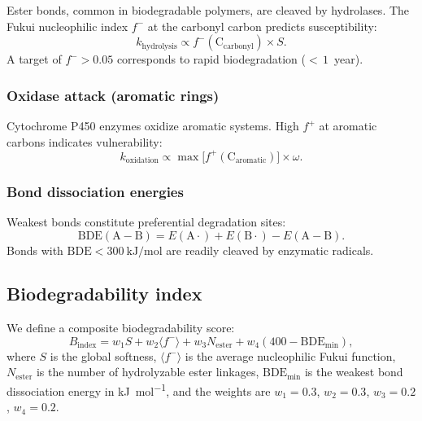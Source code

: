 \documentclass[11pt,a4paper]{article}
\begin{document}
Ester bonds, common in biodegradable polymers, are cleaved by hydrolases. The Fukui nucleophilic index $f^-$ at the carbonyl carbon predicts susceptibility:
\begin{equation}
k_{\mathrm{hydrolysis}} \propto f^-(\mathrm{C}_{\mathrm{carbonyl}}) \times S.
\end{equation}
A target of $f^- > 0.05$ corresponds to rapid biodegradation (${<}\,1$~year).

\subsubsection{Oxidase attack (aromatic rings)}

Cytochrome P450 enzymes oxidize aromatic systems. High $f^+$ at aromatic carbons indicates vulnerability:
\begin{equation}
k_{\mathrm{oxidation}} \propto \max\!\bigl[f^+(\mathrm{C}_{\mathrm{aromatic}})\bigr] \times \omega.
\end{equation}

\subsubsection{Bond dissociation energies}

Weakest bonds constitute preferential degradation sites:
\begin{equation}
\mathrm{BDE}(\mathrm{A{-}B}) = E(\mathrm{A}{\cdot}) + E(\mathrm{B}{\cdot}) - E(\mathrm{A{-}B}).
\end{equation}
Bonds with $\mathrm{BDE} < \SI{300}{\kilo\joule\per\mole}$ are readily cleaved by enzymatic radicals.

\subsection{Biodegradability index}

We define a composite biodegradability score:
\begin{equation}
B_{\mathrm{index}} = w_1 S + w_2 \langle f^- \rangle + w_3 N_{\mathrm{ester}} + w_4 (400 - \mathrm{BDE}_{\mathrm{min}}),
\end{equation}
where $S$ is the global softness, $\langle f^- \rangle$ is the average nucleophilic Fukui function, $N_{\mathrm{ester}}$ is the number of hydrolyzable ester linkages, $\mathrm{BDE}_{\mathrm{min}}$ is the weakest bond dissociation energy in \si{\kilo\joule\per\mole}, and the weights are $w_1 = 0.3$, $w_2 = 0.3$, $w_3 = 0.2$, $w_4 = 0.2$.
\end{document}
